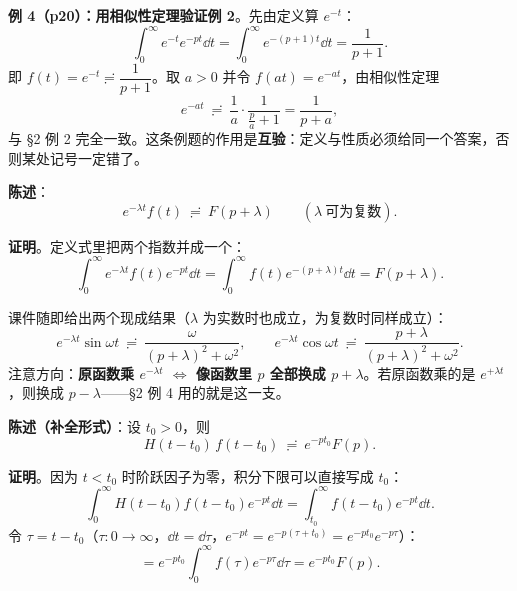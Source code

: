 \documentclass[11pt]{ctexart}
\begin{document}
\textbf{例 4（p20）：用相似性定理验证例 2}。先由定义算 $e^{-t}$：
\[ \int_0^{\infty}e^{-t}e^{-pt}\dd t=\int_0^{\infty}e^{-(p+1)t}\dd t=\frac{1}{p+1} .\]
即 $f(t)=e^{-t}\risingdotseq\dfrac{1}{p+1}$。取 $a>0$ 并令 $f(at)=e^{-at}$，由相似性定理
\[ e^{-at}\ \risingdotseq\ \frac{1}{a}\cdot\frac{1}{\frac{p}{a}+1}=\frac{1}{p+a} ,\]
与 §2 例 2 完全一致。这条例题的作用是\textbf{互验}：定义与性质必须给同一个答案，否则某处记号一定错了。


\textbf{陈述}：
\[ e^{-\lambda t}f(t)\ \risingdotseq\ F(p+\lambda) \qquad(\lambda\ \text{可为复数}) .\]

\textbf{证明}。定义式里把两个指数并成一个：
\[ \int_0^{\infty}\! e^{-\lambda t}f(t)e^{-pt}\dd t=\int_0^{\infty}\! f(t)e^{-(p+\lambda)t}\dd t=F(p+\lambda) .\]

课件随即给出两个现成结果（$\lambda$ 为实数时也成立，为复数时同样成立）：
\[ e^{-\lambda t}\sin\omega t\ \risingdotseq\ \frac{\omega}{(p+\lambda)^{2}+\omega^{2}},\qquad
e^{-\lambda t}\cos\omega t\ \risingdotseq\ \frac{p+\lambda}{(p+\lambda)^{2}+\omega^{2}} .\]
注意方向：\textbf{原函数乘 $e^{-\lambda t}$ $\Leftrightarrow$ 像函数里 $p$ 全部换成 $p+\lambda$}。若原函数乘的是 $e^{+\lambda t}$，则换成 $p-\lambda$——§2 例 4 用的就是这一支。


\textbf{陈述（补全形式）}：设 $t_0>0$，则
\[ H(t-t_0)\,f(t-t_0)\ \risingdotseq\ e^{-pt_0}F(p) .\]

\textbf{证明}。因为 $t<t_0$ 时阶跃因子为零，积分下限可以直接写成 $t_0$：
\[
\int_0^{\infty}\! H(t-t_0)f(t-t_0)e^{-pt}\dd t
=\int_{t_0}^{\infty}\! f(t-t_0)e^{-pt}\dd t .
\]
令 $\tau=t-t_0$（$\tau:0\to\infty$，$\dd t=\dd\tau$，$e^{-pt}=e^{-p(\tau+t_0)}=e^{-pt_0}e^{-p\tau}$）：
\[ =e^{-pt_0}\int_0^{\infty}\! f(\tau)e^{-p\tau}\dd\tau=e^{-pt_0}F(p) .\]


\end{document}

